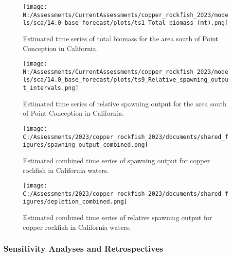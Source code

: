 \documentclass[11pt,
  english,
  letterpaper,
]{article}
\begin{document}
\pagebreak

\begin{figure}
\centering
\texttt{[image: N:/Assessments/CurrentAssessments/copper\_rockfish\_2023/models/sca/14.0\_base\_forecast/plots/ts1\_Total\_biomass\_(mt).png]}
\caption{Estimated time series of total biomass for the area south of Point Conception in California.\label{fig:tot-bio}}
\end{figure}

\pagebreak

\begin{figure}
\centering
\texttt{[image: N:/Assessments/CurrentAssessments/copper\_rockfish\_2023/models/sca/14.0\_base\_forecast/plots/ts9\_Relative\_spawning\_output\_intervals.png]}
\caption{Estimated time series of relative spawning output for the area south of Point Conception in California.\label{fig:depl}}
\end{figure}

\pagebreak

\begin{figure}
\centering
\texttt{[image: C:/Assessments/2023/copper\_rockfish\_2023/documents/shared\_figures/spawning\_output\_combined.png]}
\caption{Estimated combined time series of spawning output for copper rockfish in California waters.\label{fig:sb-all}}
\end{figure}

\clearpage

\begin{figure}
\centering
\texttt{[image: C:/Assessments/2023/copper\_rockfish\_2023/documents/shared\_figures/depletion\_combined.png]}
\caption{Estimated combined time series of relative spawning output for copper rockfish in California waters.\label{fig:depl-all}}
\end{figure}

\clearpage

\hypertarget{sensitivity-analyses-and-retrospectives}{%
\subsubsection{Sensitivity Analyses and Retrospectives}\label{sensitivity-analyses-and-retrospectives}}
\end{document}
